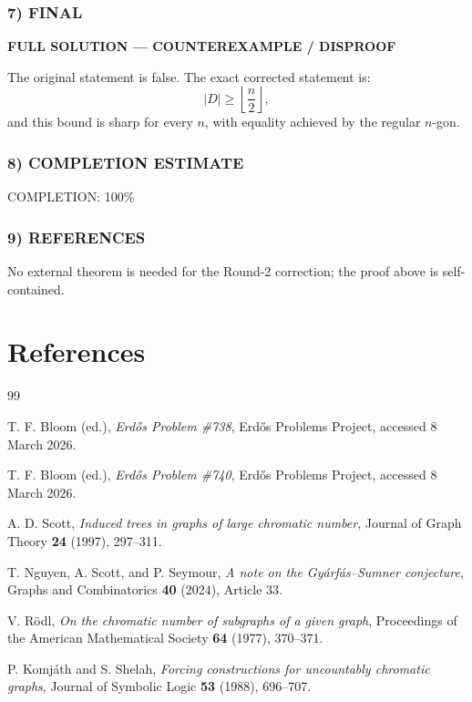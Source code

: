 \subsubsection*{7) FINAL}
\textbf{FULL SOLUTION --- COUNTEREXAMPLE / DISPROOF}

The original statement is false. The exact corrected statement is:
\[
|D|\ge \left\lfloor\frac n2\right\rfloor,
\]
and this bound is sharp for every $n$, with equality achieved by the regular $n$-gon.

\subsubsection*{8) COMPLETION ESTIMATE}
COMPLETION: 100\%

\subsubsection*{9) REFERENCES}
No external theorem is needed for the Round-2 correction; the proof above is self-contained.


\section{References}
\begin{thebibliography}{99}

T. F. Bloom (ed.), \emph{Erd\H{o}s Problem \#738}, Erd\H{o}s Problems Project, accessed 8 March 2026.

T. F. Bloom (ed.), \emph{Erd\H{o}s Problem \#740}, Erd\H{o}s Problems Project, accessed 8 March 2026.

A. D. Scott, \emph{Induced trees in graphs of large chromatic number}, Journal of Graph Theory \textbf{24} (1997), 297--311.

T. Nguyen, A. Scott, and P. Seymour, \emph{A note on the Gy\'{a}rf\'{a}s--Sumner conjecture}, Graphs and Combinatorics \textbf{40} (2024), Article 33.

V. R\"{o}dl, \emph{On the chromatic number of subgraphs of a given graph}, Proceedings of the American Mathematical Society \textbf{64} (1977), 370--371.

P. Komj\'{a}th and S. Shelah, \emph{Forcing constructions for uncountably chromatic graphs}, Journal of Symbolic Logic \textbf{53} (1988), 696--707.

\end{thebibliography}
